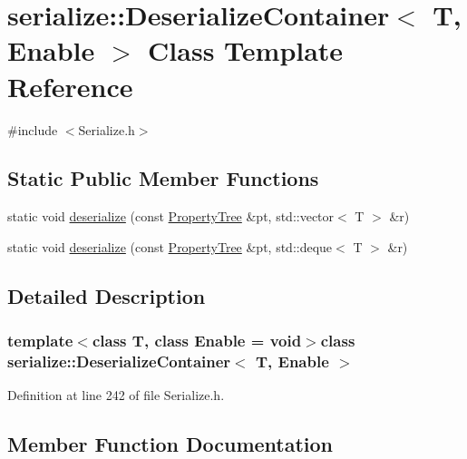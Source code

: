 \hypertarget{classserialize_1_1_deserialize_container}{}\section{serialize\+:\+:Deserialize\+Container$<$ T, Enable $>$ Class Template Reference}
\label{classserialize_1_1_deserialize_container}


{\ttfamily \#include $<$Serialize.\+h$>$}

\subsection*{Static Public Member Functions}
\begin{DoxyCompactItemize}
\item 
static void \hyperlink{classserialize_1_1_deserialize_container_a81bdeaff0ef56f203cc65b1d0691c471}{deserialize} (const \hyperlink{namespacesolar__core_adeda2737d6938c190eb774a5b2495045}{Property\+Tree} \&pt, std\+::vector$<$ T $>$ \&r)
\item 
static void \hyperlink{classserialize_1_1_deserialize_container_a393ffc783bcb56715d088fd615d9fe3e}{deserialize} (const \hyperlink{namespacesolar__core_adeda2737d6938c190eb774a5b2495045}{Property\+Tree} \&pt, std\+::deque$<$ T $>$ \&r)
\end{DoxyCompactItemize}


\subsection{Detailed Description}
\subsubsection*{template$<$class T, class Enable = void$>$class serialize\+::\+Deserialize\+Container$<$ T, Enable $>$}



Definition at line 242 of file Serialize.\+h.



\subsection{Member Function Documentation}
\hypertarget{classserialize_1_1_deserialize_container_a81bdeaff0ef56f203cc65b1d0691c471}{}
